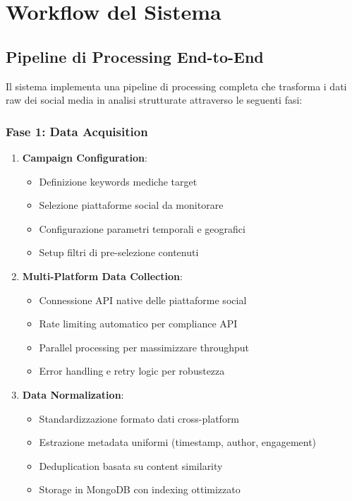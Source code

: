 \documentclass[12pt,a4paper]{report}
\begin{document}
\section{Workflow del Sistema}

\subsection{Pipeline di Processing End-to-End}

Il sistema implementa una pipeline di processing completa che trasforma i dati raw dei social media in analisi strutturate attraverso le seguenti fasi:

\subsubsection{Fase 1: Data Acquisition}

\begin{enumerate}
    \item \textbf{Campaign Configuration}:
    \begin{itemize}
        \item Definizione keywords mediche target
        \item Selezione piattaforme social da monitorare
        \item Configurazione parametri temporali e geografici
        \item Setup filtri di pre-selezione contenuti
    \end{itemize}
    
    \item \textbf{Multi-Platform Data Collection}:
    \begin{itemize}
        \item Connessione API native delle piattaforme social
        \item Rate limiting automatico per compliance API
        \item Parallel processing per massimizzare throughput
        \item Error handling e retry logic per robustezza
    \end{itemize}
    
    \item \textbf{Data Normalization}:
    \begin{itemize}
        \item Standardizzazione formato dati cross-platform
        \item Estrazione metadata uniformi (timestamp, author, engagement)
        \item Deduplication basata su content similarity
        \item Storage in MongoDB con indexing ottimizzato
    \end{itemize}
\end{enumerate}
\end{document}
